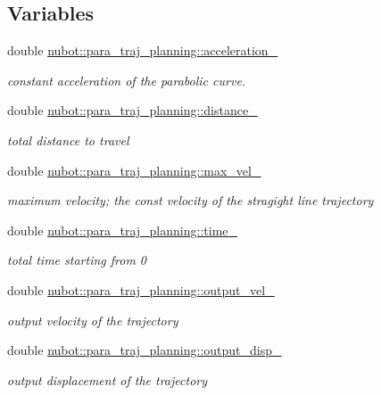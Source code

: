 \subsection*{Variables}
\begin{DoxyCompactItemize}
\item 
double \hyperlink{group__nubot_gac2f88068a317316a2e483be7d75a71b8}{nubot\-::para\-\_\-traj\-\_\-planning\-::acceleration\-\_\-}
\begin{DoxyCompactList}\small\item\em constant acceleration of the parabolic curve. \end{DoxyCompactList}\item 
double \hyperlink{group__nubot_ga6115be17c446c1a2437b5575baf3f5a8}{nubot\-::para\-\_\-traj\-\_\-planning\-::distance\-\_\-}
\begin{DoxyCompactList}\small\item\em total distance to travel \end{DoxyCompactList}\item 
double \hyperlink{group__nubot_ga1ae8b889bdbb7716e9fbb5821328e4d1}{nubot\-::para\-\_\-traj\-\_\-planning\-::max\-\_\-vel\-\_\-}
\begin{DoxyCompactList}\small\item\em maximum velocity; the const velocity of the stragight line trajectory \end{DoxyCompactList}\item 
double \hyperlink{group__nubot_ga06fe0c4fbd1afaa2a33672a85705410a}{nubot\-::para\-\_\-traj\-\_\-planning\-::time\-\_\-}
\begin{DoxyCompactList}\small\item\em total time starting from 0 \end{DoxyCompactList}\item 
double \hyperlink{group__nubot_gae57f0165c2b073b880bf4827bdd76204}{nubot\-::para\-\_\-traj\-\_\-planning\-::output\-\_\-vel\-\_\-}
\begin{DoxyCompactList}\small\item\em output velocity of the trajectory \end{DoxyCompactList}\item 
double \hyperlink{group__nubot_ga9095bac66ff724f1b9b9c366546f2b36}{nubot\-::para\-\_\-traj\-\_\-planning\-::output\-\_\-disp\-\_\-}
\begin{DoxyCompactList}\small\item\em output displacement of the trajectory \end{DoxyCompactList}\item 

\end{DoxyCompactItemize}
